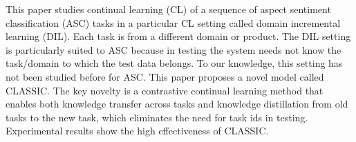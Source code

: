 This paper studies continual learning (CL) of a sequence of aspect sentiment classification (ASC) tasks in a particular CL setting called domain incremental learning (DIL). Each task is from a different domain or product. The DIL setting is particularly suited to ASC because in testing the system needs not know the task/domain to which the test data belongs. To our knowledge, this setting has not been studied before for ASC. This paper proposes a novel model called CLASSIC. The key novelty is a contrastive continual learning method that enables both knowledge transfer across tasks and knowledge distillation from old tasks to the new task, which eliminates the need for task ids in testing. Experimental results show the high effectiveness of CLASSIC.

